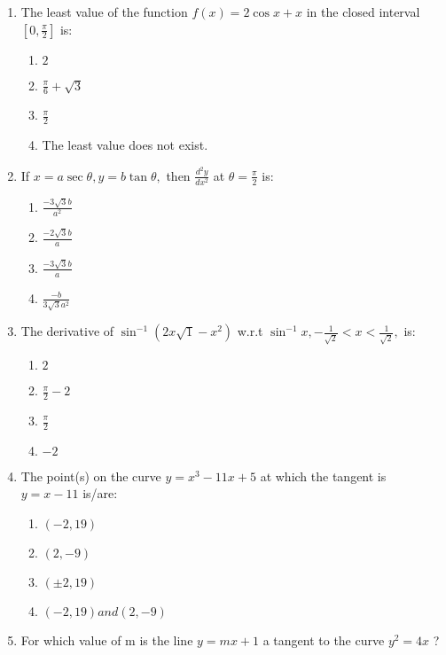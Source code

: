 \begin{enumerate}
\item The least value of the function $ f(x) = 2\cos x + x $ in the closed interval $[0, \frac{\pi}{2}]$ is:

  	\begin{enumerate}
      	\item $ 2 $ 
      	\item $ \frac{\pi}{6} + \sqrt 3$
      	\item $ \frac{\pi}{2} $
	\item  The least value does not exist. 
  	\end{enumerate}

\item If $ x = a\sec \theta, y = b\tan \theta,$ then $ \frac{d^2y}{dx^2} $ at $ \theta = \frac{\pi}{2}$ is:
  
  	\begin{enumerate}
    	\item $ \frac{-3\sqrt 3b}{a^2} $
    	\item $ \frac{-2\sqrt 3b}{a} $
    	\item $ \frac{-3\sqrt 3b}{a} $
    	\item $ \frac{-b}{3 \sqrt 3a^2 }$
  	\end{enumerate}

\item The derivative of $ \sin^{-1} (2x \sqrt 1 - x^2) $ w.r.t $ \sin^{-1} x,  -\frac{1}{\sqrt 2 } < x < \frac{1}{\sqrt 2},$ is:
  
  	\begin{enumerate}
    	\item $ 2 $
    	\item $ \frac{\pi}{2} -2 $
    	\item $ \frac{\pi}{2} $
    	\item $ -2 $
  	\end{enumerate}

\item The point(s) on the curve  $ y = x^3 - 11x + 5 $ at which the tangent is $ y = x - 11 $ is/are:
  
  	\begin{enumerate}
    	\item $ (-2, 19)$
    	\item $ ( 2, -9)$
    	\item $ (\pm 2, 19) $
    	\item $ (-2 , 19) and (2, -9) $
  	\end{enumerate}

\item For which value of m is the line  $ y = mx + 1 $ a tangent to the curve $ y^2 = 4x $ ?
  

\end{enumerate}
